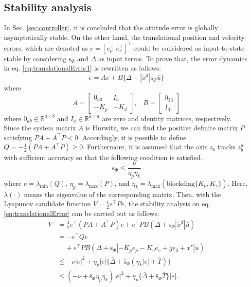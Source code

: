\documentclass[letterpaper, 10 pt, conference]{ieeeconf}  %
\begin{document}
\subsection{Stability analysis}
In Sec. \ref{sec:controller}, it is concluded that the attitude error is globally asymptotically stable.
On the other hand, the translational position and velocity errors, which are denoted as $e = [e_p^\intercal\;e_v^\intercal]^\intercal$ could be considered as input-to-state stable by considering $\text{s}_\Phi$ and $\Delta$ as input terms. To prove that, the error dynamics in eq. \eqref{eq:translationalError1} is rewritten as follows: 
\begin{equation}
\dot{e} = Ae
 + B\{\Delta+|\ddot{x}^d|\text{s}_\Phi\bar{u}\} \label{eq:translationalError} 
\end{equation}
where
\begin{equation}
A = \left[
\begin{array}{rr}
0_{33} & I_3 \\ -K_p & -K_d 
\end{array}
\right],\;\;\;B = \left[
\begin{array}{r}
0_{33} \\ I_3
\end{array}
\right] 
\end{equation}
where $0_{ab} \in \mathbb{R}^{a\times b}$ and $I_a\in\mathbb{R}^{a\times a}$ are zero and identity matrices, respectively.
Since the system matrix $A$ is Hurwitz, we can find the positive definite matrix $P$ satisfying $PA + A^\intercal P < 0$. Accordingly, it is possible to define $Q = -\frac{1}{2}(PA +A^\intercal P) \geq 0$. 
Furthermore, it is assumed that the axis $z_b$ tracks $z_b^d$ with sufficient accuracy so that the following condition is satisfied.
\begin{equation}
\text{s}_\Phi \leq {\frac{\nu}{\eta_p\eta_k}} \label{eq:angleCondition}
\end{equation}
where 
$\nu = \lambda_{\min}(Q)$, $\eta_p = \lambda_{\max}(P)$, and $\eta_k = \lambda_{\max}(\text{blockdiag}\{K_p,K_v\})$.
Here, $\lambda(\cdot)$ means the eigenvalue of the corresponding matrix.
Then, with the Lyapunov candidate function $V = \frac{1}{2}e^\intercal P e$, the stability analysis on eq. \eqref{eq:translationalError} can be carried out as follows: 
\begin{align}
\dot{V} &= \textstyle{\frac{1}{2}}e^\intercal (PA + A^\intercal P)e + e^\intercal P B (\Delta + \text{s}_\Phi|\ddot{x}^d|\bar{u}) \nonumber \\
&= -e^\intercal Q e \label{eq:lyapForFunnel} \\
&\;\;\;\; + e^\intercal P B (\Delta + \text{s}_\Phi |-K_p e_p - K_v e_v +ge_3+{\ddot{x}}^r|\bar{u}) \nonumber  \\
&\leq -\nu |e|^2 + \eta_p|e|\{\bar{\Delta}+\bar{\text{s}}_\Phi(\eta_k|e|+\bar{T})\} \nonumber \\
&\leq (-\nu + \bar{\text{s}}_\Phi\eta_p\eta_k)|e|^2 + \eta_p\{\bar{\Delta} + \bar{\text{s}}_\Phi\bar{T}\}|e|. \nonumber 
\end{align}
\end{document}
